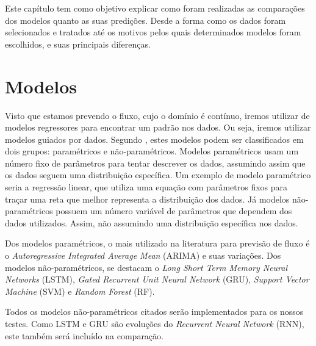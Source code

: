 




Este capítulo tem como objetivo explicar como foram realizadas as comparações dos modelos quanto as suas predições. Desde a forma como os dados foram selecionados e tratados até os motivos pelos quais determinados modelos foram escolhidos, e suas principais diferenças. 

\section{Modelos}

Visto que estamos prevendo o fluxo, cujo o domínio é contínuo, iremos utilizar de modelos regressores para encontrar um padrão nos dados. Ou seja, iremos utilizar modelos guiados por dados. Segundo \cite{parametric}, estes modelos podem ser classificados em dois grupos: paramétricos e não-paramétricos. Modelos paramétricos usam um número fixo de parâmetros para tentar descrever os dados, assumindo assim que os dados seguem uma distribuição específica. Um exemplo de modelo paramétrico seria a regressão linear, que utiliza uma equação com parâmetros fixos para traçar uma reta que melhor representa a distribuição dos dados. Já modelos não-paramétricos possuem um número variável de parâmetros que dependem dos dados utilizados. Assim, não assumindo uma distribuição específica nos dados.

Dos modelos paramétricos, o mais utilizado na literatura para previsão de fluxo é o \textit{Autoregressive Integrated Average Mean} (ARIMA) e suas variações. Dos modelos não-paramétricos, se destacam o \textit{Long Short Term Memory Neural Networks} (LSTM), \textit{Gated Recurrent Unit Neural Network} (GRU), \textit{Support Vector Machine} (SVM) e \textit{Random Forest} (RF). 

Todos os modelos não-paramétricos citados serão implementados para os nossos testes. Como LSTM e GRU são evoluções do \textit{Recurrent Neural Network} (RNN), este também será incluído na comparação. 

